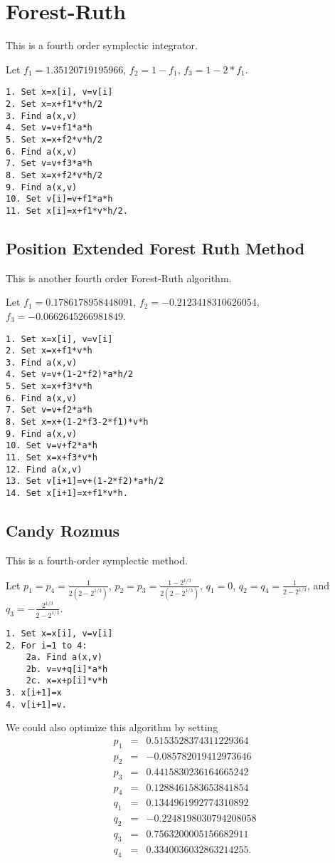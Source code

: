 \documentclass[11pt]{article}
\begin{document}
\section{Forest-Ruth}
This is a fourth order symplectic integrator.

Let $f_1=1.35120719195966$, $f_2=1-f_1$, $f_3=1-2*f_1$.
\begin{verbatim}
1. Set x=x[i], v=v[i]
2. Set x=x+f1*v*h/2
3. Find a(x,v)
4. Set v=v+f1*a*h
5. Set x=x+f2*v*h/2
6. Find a(x,v)
7. Set v=v+f3*a*h
8. Set x=x+f2*v*h/2
9. Find a(x,v)
10. Set v[i]=v+f1*a*h
11. Set x[i]=x+f1*v*h/2.
\end{verbatim}

\subsection{Position Extended Forest Ruth Method}
This is another fourth order Forest-Ruth algorithm.

Let $f_1=0.1786178958448091$, $f_2=-0.2123418310626054$,
$f_3=-0.0662645266981849$.
\begin{verbatim}
1. Set x=x[i], v=v[i]
2. Set x=x+f1*v*h
3. Find a(x,v)
4. Set v=v+(1-2*f2)*a*h/2
5. Set x=x+f3*v*h
6. Find a(x,v)
7. Set v=v+f2*a*h
8. Set x=x+(1-2*f3-2*f1)*v*h
9. Find a(x,v)
10. Set v=v+f2*a*h
11. Set x=x+f3*v*h
12. Find a(x,v)
13. Set v[i+1]=v+(1-2*f2)*a*h/2
14. Set x[i+1]=x+f1*v*h.
\end{verbatim}

\subsection{Candy Rozmus}
This is a fourth-order symplectic method.

Let
$p_1=p_4=\frac{1}{2(2-2^{1/3})}$,
$p_2=p_3=\frac{1-2^{1/3}}{2(2-2^{1/3})}$,
$q_1=0$,
$q_2=q_4=\frac{1}{2-2^{1/3}}$,
and
$q_3=-\frac{2^{1/3}}{2-2^{1/3}}$.
\begin{verbatim}
1. Set x=x[i], v=v[i]
2. For i=1 to 4:
    2a. Find a(x,v)
    2b. v=v+q[i]*a*h
    2c. x=x+p[i]*v*h
3. x[i+1]=x
4. v[i+1]=v.
\end{verbatim}
We could also optimize this algorithm by setting
\begin{eqnarray*}
p_1&=&0.5153528374311229364\\
p_2&=&-0.085782019412973646\\
p_3&=&0.4415830236164665242\\
p_4&=&0.1288461583653841854\\
q_1&=&0.1344961992774310892\\
q_2&=&-0.2248198030794208058\\
q_3&=&0.7563200005156682911\\
q_4&=&0.3340036032863214255.
\end{eqnarray*}
\end{document}
